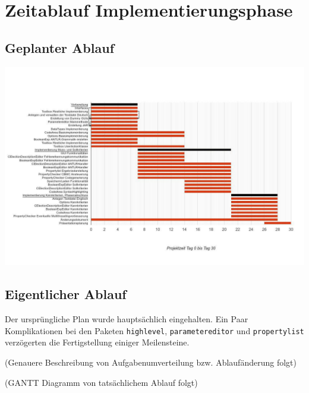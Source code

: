 \documentclass[a4paper]{scrreprt}
\begin{document}
\chapter{Zeitablauf Implementierungsphase}

\section{Geplanter Ablauf}

\includegraphics[width=1.3\textwidth] {originalPlanung.jpg}

\section{Eigentlicher Ablauf}
Der ursprüngliche Plan wurde hauptsächlich eingehalten. Ein Paar Komplikationen bei den Paketen \verb!highlevel!, \verb!parametereditor! und \verb!propertylist! verzögerten die Fertigstellung einiger Meilensteine.

(Genauere Beschreibung von Aufgabenumverteilung bzw. Ablaufänderung folgt)

(GANTT Diagramm von tatsächlichem Ablauf folgt)
\end{document}
